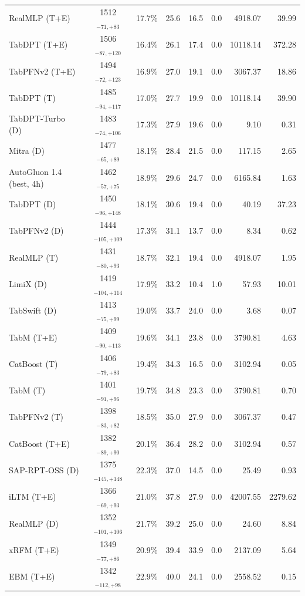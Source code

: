 \begin{tabular}{lcccccrr}
RealMLP (T+E) & 1512${}_{-71,+83}$ & 17.7\% & 25.6 & 16.5 & 0.0 & 4918.07 & 39.99 \\
TabDPT (T+E) & 1506${}_{-87,+120}$ & 16.4\% & 26.1 & 17.4 & 0.0 & 10118.14 & 372.28 \\
TabPFNv2 (T+E) & 1494${}_{-72,+123}$ & 16.9\% & 27.0 & 19.1 & 0.0 & 3067.37 & 18.86 \\
TabDPT (T) & 1485${}_{-94,+117}$ & 17.0\% & 27.7 & 19.9 & 0.0 & 10118.14 & 39.90 \\
TabDPT-Turbo (D) & 1483${}_{-74,+106}$ & 17.3\% & 27.9 & 19.6 & 0.0 & 9.10 & 0.31 \\
Mitra (D) & 1477${}_{-65,+89}$ & 18.1\% & 28.4 & 21.5 & 0.0 & 117.15 & 2.65 \\
AutoGluon 1.4 (best, 4h) & 1462${}_{-57,+75}$ & 18.9\% & 29.6 & 24.7 & 0.0 & 6165.84 & 1.63 \\
TabDPT (D) & 1450${}_{-96,+148}$ & 18.1\% & 30.6 & 19.4 & 0.0 & 40.19 & 37.23 \\
TabPFNv2 (D) & 1444${}_{-105,+109}$ & 17.3\% & 31.1 & 13.7 & 0.0 & 8.34 & 0.62 \\
RealMLP (T) & 1431${}_{-80,+93}$ & 18.7\% & 32.1 & 19.4 & 0.0 & 4918.07 & 1.95 \\
LimiX (D) & 1419${}_{-104,+114}$ & 17.9\% & 33.2 & 10.4 & 1.0 & 57.93 & 10.01 \\
TabSwift (D) & 1413${}_{-75,+99}$ & 19.0\% & 33.7 & 24.0 & 0.0 & 3.68 & 0.07 \\
TabM (T+E) & 1409${}_{-90,+113}$ & 19.6\% & 34.1 & 23.8 & 0.0 & 3790.81 & 4.63 \\
CatBoost (T) & 1406${}_{-79,+83}$ & 19.4\% & 34.3 & 16.5 & 0.0 & 3102.94 & 0.05 \\
TabM (T) & 1401${}_{-91,+96}$ & 19.7\% & 34.8 & 23.3 & 0.0 & 3790.81 & 0.70 \\
TabPFNv2 (T) & 1398${}_{-83,+82}$ & 18.5\% & 35.0 & 27.9 & 0.0 & 3067.37 & 0.47 \\
CatBoost (T+E) & 1382${}_{-89,+90}$ & 20.1\% & 36.4 & 28.2 & 0.0 & 3102.94 & 0.57 \\
SAP-RPT-OSS (D) & 1375${}_{-145,+148}$ & 22.3\% & 37.0 & 14.5 & 0.0 & 25.49 & 0.93 \\
iLTM (T+E) & 1366${}_{-69,+93}$ & 21.0\% & 37.8 & 27.9 & 0.0 & 42007.55 & 2279.62 \\
RealMLP (D) & 1352${}_{-101,+106}$ & 21.7\% & 39.2 & 25.0 & 0.0 & 24.60 & 8.84 \\
xRFM (T+E) & 1349${}_{-77,+86}$ & 20.9\% & 39.4 & 33.9 & 0.0 & 2137.09 & 5.64 \\
EBM (T+E) & 1342${}_{-112,+98}$ & 22.9\% & 40.0 & 24.1 & 0.0 & 2558.52 & 0.15 \\

\end{tabular}

